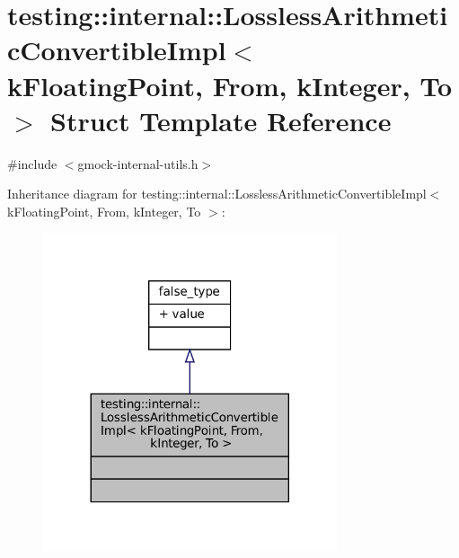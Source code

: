 \hypertarget{structtesting_1_1internal_1_1LosslessArithmeticConvertibleImpl_3_01kFloatingPoint_00_01From_00_01kInteger_00_01To_01_4}{}\section{testing\+:\+:internal\+:\+:Lossless\+Arithmetic\+Convertible\+Impl$<$ k\+Floating\+Point, From, k\+Integer, To $>$ Struct Template Reference}
\label{structtesting_1_1internal_1_1LosslessArithmeticConvertibleImpl_3_01kFloatingPoint_00_01From_00_01kInteger_00_01To_01_4}


{\ttfamily \#include $<$gmock-\/internal-\/utils.\+h$>$}



Inheritance diagram for testing\+:\+:internal\+:\+:Lossless\+Arithmetic\+Convertible\+Impl$<$ k\+Floating\+Point, From, k\+Integer, To $>$\+:
\nopagebreak
\begin{figure}[H]
\begin{center}
\leavevmode
\includegraphics[width=245pt]{structtesting_1_1internal_1_1LosslessArithmeticConvertibleImpl_3_01kFloatingPoint_00_01From_00_0087463382fff097dbb36f2d5498cbe44}
\end{center}
\end{figure}


